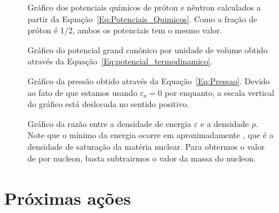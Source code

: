 \begin{figure}
	
	\caption{Gráfico dos potenciais químicos de próton e nêutron calculados a partir da Equação~\eqref{Eq:Potenciais_Quimicos}. Como a fração de próton é 1/2, ambos os potenciais tem o mesmo valor. \protect}
	\label{Fig:chemical_potential_graph_eNJL1m}
\end{figure}

\FloatBarrier

\begin{figure}
	
	\caption{Gráfico do potencial grand canônico por unidade de volume obtido através da Equação~\eqref{Eq:potencial_termodinamico}. \protect}
	\label{Fig:thermodynamic_potential_graph_eNJL1m}
\end{figure}

\begin{figure}
	
	\caption{Gráfico da pressão obtido através da Equação~\eqref{Eq:Pressao}. Devido ao fato de que estamos usando $\varepsilon_o = 0$ por enquanto, a escala vertical do gráfico está deslocada no sentido positivo. \protect}
	\label{Fig:pressure_graph_eNJL1m}
\end{figure}

\begin{figure}
	
	\caption{Gráfico da razão entre a densidade de energia $\varepsilon$ e a densidade $\rho$. Note que o mínimo da energia ocorre em aproximadamente , que é a densidade de saturação da matéria nuclear. Para obtermos o valor de  por nucleon, basta subtrairmos o valor da massa do nucleon. \protect}
	\label{Fig:energy_by_nucleon_graph_eNJL1m}
\end{figure}

\FloatBarrier


\section{Próximas ações}

